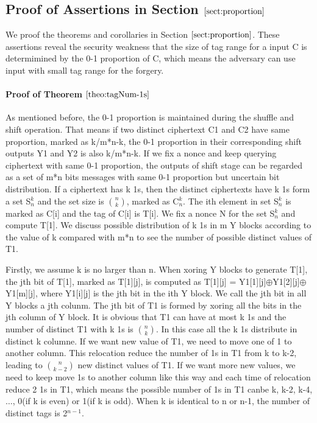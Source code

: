 \documentclass{article}
\begin{document}
\subsection{Proof of Assertions in Section $\ref{sect:proportion}$}
We proof the theorems and corollaries in Section $\ref{sect:proportion}$. These assertions reveal the security weakness that the size of tag range for a input C is determimined by the 0-1 proportion of C, which means the adversary can use input with small tag range for the forgery. 
\paragraph{Proof of Theorem $\ref{theo:tagNum-1s}$}
As mentioned before, the 0-1 proportion is maintained during the shuffle and shift operation. That means if two distinct ciphertext C1 and C2 have same proportion, marked as k/m*n-k, the 0-1 proportion in their corresponding shift outputs Y1 and Y2 is also k/m*n-k.  
If we fix a nonce and keep querying ciphertext with same 0-1 proportion, the outputs of shift stage can be regarded as a set of m*n bits messages with same 0-1 proportion but uncertain bit distribution. If a ciphertext has k 1s, then the distinct ciphertexts have k 1s form a set S$_{n}^{k}$ and the set size is $\binom{n}{k}$, marked as C$_{n}^{k}$. The ith element in set S$_{n}^{k}$ is marked as C[i] and the tag of C[i] is T[i].   
We fix a nonce N for the set S$_{n}^{k}$ and compute T[1]. We discuss possible distribution of k 1s in m Y blocks according to the value of k compared with m*n to see the number of possible distinct values of T1. 

Firstly, we assume k is no larger than n. When xoring Y blocks to generate T[1], the jth bit of T[1], marked as T[1][j], is computed as T[1][j] = Y1[1][j]$\oplus$Y1[2][j]$\oplus$Y1[m][j], where Y1[i][j] is the jth bit in the ith Y block. We call the jth bit in all Y blocks a jth colunm. The jth bit of T1 is formed by xoring all the bits in the jth column of Y block.  It is obvious that T1 can have at most k 1s and the number of distinct T1 with k 1s is $\binom{n}{k}$. In this case all the k 1s distribute in distinct k columne.  If we want new value of T1, we need to move one of 1 to another column. This relocation reduce the number of 1s in T1 from k to k-2, leading to $\binom{n}{k-2}$ new distinct values of T1. If we want more new values, we need to keep move 1s to another column like this way and each time of relocation reduce 2 1s in T1, which means the possible number of 1s in T1 canbe k, k-2, k-4,$\ldots$, 0(if k is even) or 1(if k is odd). 
When k is identical to n or n-1, the number of distinct tags is 2$^{n-1}$.  
\end{document}
